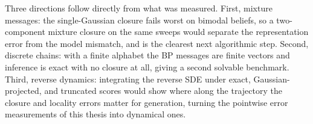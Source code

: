 Three directions follow directly from what was measured. First, mixture
messages: the single-Gaussian closure fails worst on bimodal beliefs, so
a two-component mixture closure on the same sweeps would separate the
representation error from the model mismatch, and is the clearest next
algorithmic step. Second, discrete chains: with a finite alphabet the BP
messages are finite vectors and inference is exact with no closure at
all, giving a second solvable benchmark. Third, reverse dynamics:
integrating the reverse SDE under exact, Gaussian-projected, and
truncated scores would show where along the trajectory the closure and
locality errors matter for generation, turning the pointwise error
measurements of this thesis into dynamical ones.

